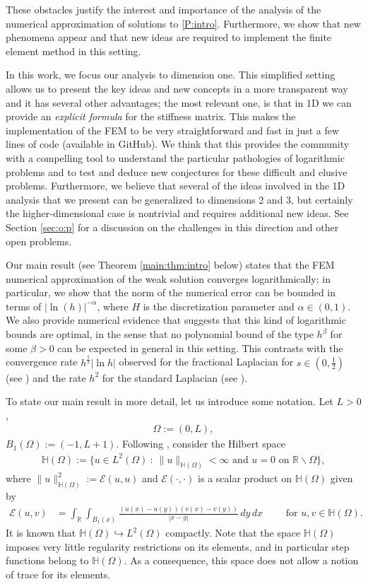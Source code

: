 \documentclass[11 pt]{article}
\numberwithin{equation}{section}
\def\R{\mathbb{R}}
\def\mH{\mathbb{H}}
\begin{document}
 These obstacles justify the interest and importance of the analysis of the numerical approximation of solutions to \eqref{P:intro}.  Furthermore, we show that new phenomena appear and that new ideas are required to implement the finite element method in this setting.

In this work, we focus our analysis to dimension one. This simplified setting allows us to present the key ideas and new concepts in a more transparent way and it has several other advantages; the most relevant one, is that in 1D we can provide an \emph{explicit formula} for the stiffness matrix.  This makes the implementation of the FEM to be very straightforward and fast in just a few lines of code (available in GitHub).  We think that this provides the community with a compelling tool to understand the particular pathologies of logarithmic problems and to test and deduce new conjectures for these difficult and elusive problems. Furthermore, we believe that several of the ideas involved in the 1D analysis that we present can be generalized to dimensions 2 and 3, but certainly the higher-dimensional case is nontrivial and requires additional new ideas. See Section \ref{sec:o:p} for a discussion on the challenges in this direction and other open problems.

Our main result (see Theorem \ref{main:thm:intro} below) states that the FEM numerical approximation of the weak solution converges logarithmically; in particular, we show that the norm of the numerical error can be bounded in terms of $|\ln(h)|^{-\alpha}$, where $H$ is the discretization parameter and $\alpha\in(0,1)$. We also provide numerical evidence that suggests that this kind of logarithmic bounds are optimal, in the sense that no polynomial bound of the type $h^\beta$ for some $\beta>0$ can be expected in general in this setting.  This contrasts with the convergence rate $h^\frac{1}{2}|\ln h|$ observed for the fractional Laplacian for $s\in(0,\frac{1}{2})$ (see \cite[Theorem 3.31]{Bor17}) and the rate $h^2$ for the standard Laplacian (see \cite{???}).

To state our main result in more detail, let us introduce some notation. Let $L>0$,
\begin{align*}
\Omega:=(0,L),
\end{align*}
 $B_1(\Omega):=(-1,L+1)$. Following \cite{CW19}, consider the Hilbert space
\begin{align*}
\mH(\Omega):=\{u\in L^2(\Omega)\::\: \|u\|_{\mathbb H(\Omega)}<\infty \text{ and }u=0\text{ on }\R\backslash \Omega\},
\end{align*}
where $\|u\|^2_{\mathbb H(\Omega)}:={\mathcal E}(u,u)$ and ${\mathcal E}(\cdot,\cdot)$ is a scalar product on $\mathbb H(\Omega)$ given by
\begin{align*}
    {\mathcal E}(u,v)&=\int_{\R}\int_{B_1(x)}\frac{(u(x)-u(y))(v(x)-v(y))}{|x-y|}\, dy\, dx \qquad \text{ for }u,v\in \mH(\Omega).
\end{align*}
It is known that $\mathbb H(\Omega)\hookrightarrow L^2(\Omega)$ compactly. Note that the space $\mH(\Omega)$ imposes very little regularity restrictions on its elements, and in particular step functions belong to $\mH(\Omega)$. As a consequence, this space does not allow a notion of trace for its elements.
\end{document}
